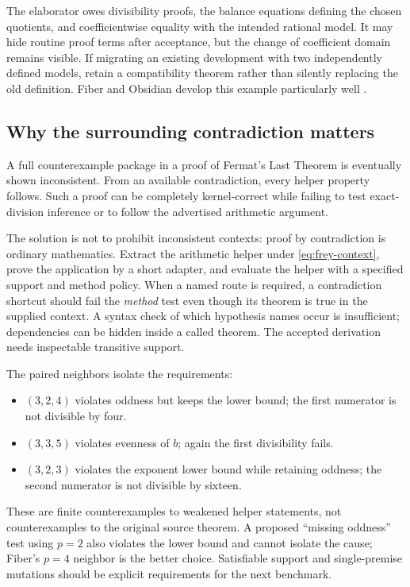 \documentclass[11pt,letterpaper]{article}
\theoremstyle{definition}\newtheorem{definition}[proposition]{Definition}
\theoremstyle{remark}\newtheorem{remark}[proposition]{Remark}
\begin{document}
The elaborator owes divisibility proofs, the balance equations defining the
chosen quotients, and coefficientwise equality with the intended rational
model. It may hide routine proof terms after acceptance, but the change of
coefficient domain remains visible. If migrating an existing development with
two independently defined models, retain a compatibility theorem rather than
silently replacing the old definition. Fiber and Obsidian develop this example
particularly well \cite[Section 9]{fiber}\cite[Section 6]{obsidian}.

\subsection{Why the surrounding contradiction matters}
A full counterexample package in a proof of Fermat's Last Theorem is eventually
shown inconsistent. From an available contradiction, every helper property
follows. Such a proof can be completely kernel-correct while failing to test
exact-division inference or to follow the advertised arithmetic argument.

The solution is not to prohibit inconsistent contexts: proof by contradiction
is ordinary mathematics. Extract the arithmetic helper under
\eqref{eq:frey-context}, prove the application by a short adapter, and evaluate
the helper with a specified support and method policy. When a named route is
required, a contradiction shortcut should fail the \emph{method} test even
though its theorem is true in the supplied context. A syntax check of which
hypothesis names occur is insufficient; dependencies can be hidden inside a
called theorem. The accepted derivation needs inspectable transitive support.

The paired neighbors isolate the requirements:
\begin{itemize}
\item $(3,2,4)$ violates oddness but keeps the lower bound; the first numerator
is not divisible by four.
\item $(3,3,5)$ violates evenness of $b$; again the first divisibility fails.
\item $(3,2,3)$ violates the exponent lower bound while retaining oddness; the
second numerator is not divisible by sixteen.
\end{itemize}
These are finite counterexamples to weakened helper statements, not counterexamples
to the original source theorem. A proposed ``missing oddness'' test using $p=2$
also violates the lower bound and cannot isolate the cause; Fiber's $p=4$
neighbor is the better choice. Satisfiable support and single-premise mutations
should be explicit requirements for the next benchmark.
\end{document}

